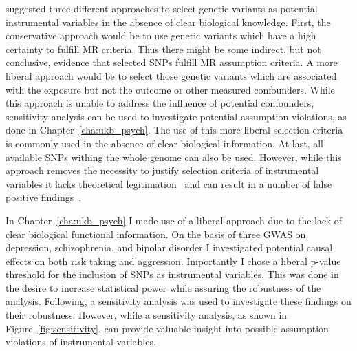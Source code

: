 \citet{Burgess2016a} suggested three different approaches to select genetic variants as potential instrumental  variables in the absence of clear biological knowledge.
First, the conservative approach would be to use genetic variants which have a high certainty to fulfill MR criteria.
Thus there might be some indirect, but not conclusive, evidence that selected SNPs fulfill MR assumption criteria.
A more liberal approach would be to select those genetic variants which are associated with the exposure but not the outcome or other measured confounders.
While this approach is unable to address the influence of potential confounders, sensitivity analysis can be used to investigate potential assumption violations, as done in Chapter~\ref{cha:ukb_psych}.
The use of this more liberal selection criteria is commonly used in the absence of clear biological information.
At last, all available SNPs withing the whole genome can also be used.
However, while this approach removes the necessity to justify  selection criteria of instrumental variables it lacks theoretical legitimation~\cite{Burgess2016a} and can result in a number of false positive findings~\cite{Evans2013}.

In Chapter~\ref{cha:ukb_psych} I made use of a liberal approach due to the lack of clear biological functional information.
On the basis of three GWAS on depression, schizophrenia, and bipolar disorder I investigated potential causal effects on both risk taking and aggression.
Importantly I chose a liberal p-value threshold for the inclusion of SNPs as instrumental variables.
This was done in the desire to increase statistical power while assuring the robustness of the analysis.
Following, a sensitivity analysis was used to investigate these findings on their robustness.
However, while a sensitivity analysis, as shown in Figure~\ref{fig:sensitivity}, can provide valuable insight into possible assumption violations of instrumental variables.

